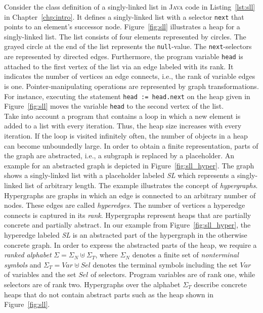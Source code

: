 \documentclass[a4paper, 12pt, twoside]{report}
\begin{document}
	Consider the class definition of a singly-linked list in \textsc{Java} code in Listing~\ref{lst:sll} in Chapter~\ref{chp:intro}. It defines a singly-linked list with a selector \texttt{next} that points to an element's successor node. Figure~\ref{fig:sll} illustrates a heap for a singly-linked list. The list consists of four elements represented by circles. The grayed circle at the end of the list represents the \texttt{null}-value. The \texttt{next}-selectors are represented by directed edges. Furthermore, the program variable \texttt{head} is attached to the first vertex of the list via an edge labeled with its rank. It indicates the number of vertices an edge connects, i.e., the rank of variable edges is one. Pointer-manipulating operations are represented by graph transformations. For instance, executing the statement \texttt{head := head.next} on the heap given in Figure~\ref{fig:sll} moves the variable \texttt{head} to the second vertex of the list.\\ 			

	Take into account a program that contains a loop in which a new element is added to a list with every iteration. Thus, the  heap size increases with every iteration. If the loop is visited infinitely often, the number of objects in a heap can become unboundedly large. In order to obtain a finite representation, parts of the graph are abstracted, i.e., a subgraph is replaced by a placeholder. An example for an abstracted graph is depicted in Figure~\ref{fig:sll_hyper}. The graph shows a singly-linked list with a placeholder labeled \textit{SL} which represents a singly-linked list of arbitrary length. The example illustrates the concept of \textit{hypergraphs}. Hypergraphs are graphs in which an edge is connected to an arbitrary number of nodes. These edges are called \textit{hyperedges}. The number of vertices a hyperedge connects is captured in its \textit{rank}. Hypergraphs represent heaps that are partially concrete and partially abstract. In our example from Figure~\ref{fig:sll_hyper}, the hyperedge labeled \textit{SL} is an abstracted part of the hypergraph in the otherwise concrete graph. In order to express the abstracted parts of the heap, we require a \textit{ranked alphabet} $\Sigma = \Sigma_N \uplus \Sigma_T$, where $\Sigma_N$ denotes a finite set of \textit{nonterminal symbols} and $\Sigma_T=Var \uplus Sel$ denotes the terminal symbols including the set $Var$ of variables and the set $Sel$ of selectors. Program variables are of rank one, while selectors are of rank two. Hypergraphs over the alphabet $\Sigma_T$ describe concrete heaps that do not contain abstract parts such as the heap shown in Figure~\ref{fig:sll}.	
	
\end{document}
